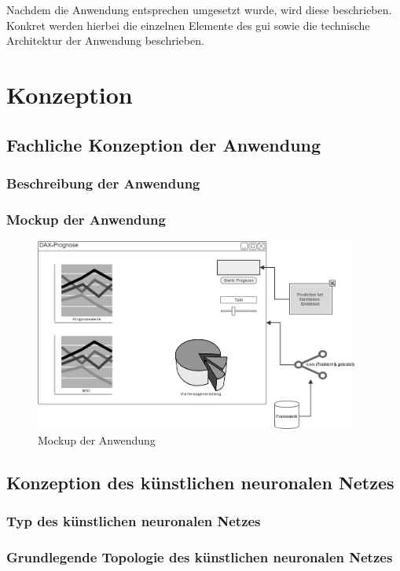 \documentclass[a4paper,DIV11,bibliography=totoc,headings=normal,ngerman,headsepline,listof=totoc,parskip=half]{scrreprt}
\begin{document}
Nachdem die Anwendung entsprechen umgesetzt wurde, wird diese beschrieben. Konkret werden hierbei die einzelnen Elemente des \ac{gui} sowie die technische Architektur der Anwendung beschrieben.

 
\chapter{Konzeption}
\label{cha:Konzeption}
\section{Fachliche Konzeption der Anwendung} %
\label{sec:faco}
\subsection{Beschreibung der Anwendung}
\label{subsec:beaw}
\subsection{Mockup der Anwendung}
\label{subsec:moaw}
\begin{figure}[htbp]
\centering
		\includegraphics[width=0.95\textwidth]{mockup.PNG}
	\caption{Mockup der Anwendung}
	\label{fig:Mockup der Anwendung}
\end{figure}


\section{Konzeption des künstlichen neuronalen Netzes} %
\subsection{Typ des künstlichen neuronalen Netzes} %
\subsection{Grundlegende Topologie des künstlichen neuronalen Netzes} %
\end{document}
